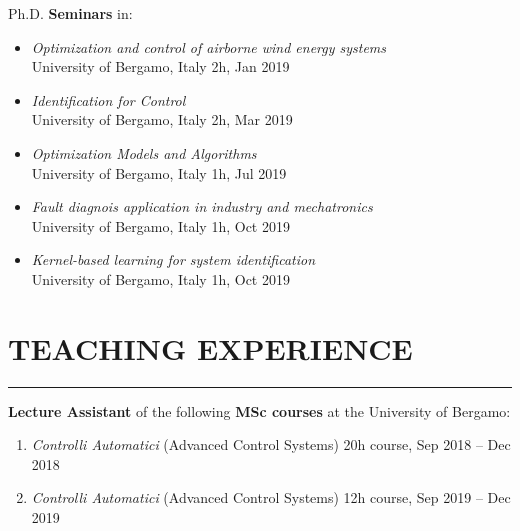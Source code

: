 \documentclass[10pt]{article}
\newcommand{\cvsection}[1]{\section*{\centering\normalsize\uppercase{#1}}\vspace{-16pt}\rule{\linewidth}{0.2pt}}
\begin{document}
\vspace{6pt} %

Ph.D. \textbf{Seminars} in:
\begin{itemize}	
	\setlength\itemsep{-3pt}
	\renewcommand\labelitemi{$\vcenter{\hbox{\tiny$\bullet$}}$}
	\item \textit{Optimization and control of airborne wind energy systems}\\
	University of Bergamo, Italy \hfill 2h, Jan 2019\\
	\item \textit{Identification for Control}\\
	University of Bergamo, Italy \hfill 2h, Mar 2019\\
	\item \textit{Optimization Models and Algorithms}\\
	University of Bergamo, Italy \hfill 1h, Jul 2019\\
	\item \textit{Fault diagnois application in industry and mechatronics}\\
	University of Bergamo, Italy \hfill 1h, Oct 2019\\
	\item \textit{Kernel-based learning for system identification}\\
	University of Bergamo, Italy \hfill 1h, Oct 2019\\
\end{itemize}


\cvsection{teaching experience}

\textbf{Lecture Assistant} of the following \textbf{MSc courses} at the University of Bergamo:
\begin{enumerate}
	\setlength\itemsep{-3pt}
	\item \textit{Controlli Automatici} (Advanced Control Systems) \hfill 20h course, Sep 2018 – Dec 2018\\
	\item \textit{Controlli Automatici} (Advanced Control Systems) \hfill 12h course, Sep 2019 – Dec 2019\\
\end{enumerate}
\end{document}
